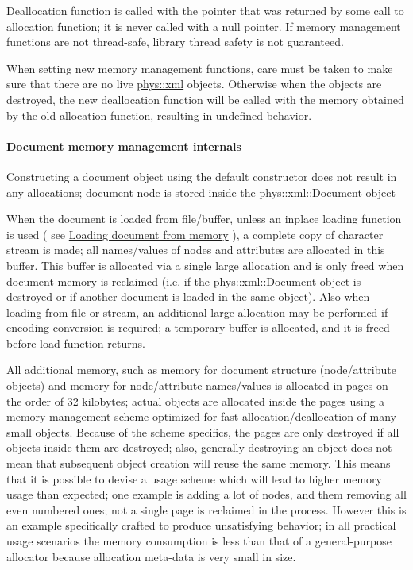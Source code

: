  \par
 Deallocation function is called with the pointer that was returned by some call to allocation function; it is never called with a null pointer. If memory management functions are not thread-\/safe, library thread safety is not guaranteed. \par
 \par
 When setting new memory management functions, care must be taken to make sure that there are no live \hyperlink{namespacephys_1_1xml}{phys::xml} objects. Otherwise when the objects are destroyed, the new deallocation function will be called with the memory obtained by the old allocation function, resulting in undefined behavior. \par
 \par
 \hypertarget{XMLManual_XMLMemoryInternals}{}\paragraph{Document memory management internals}\label{XMLManual_XMLMemoryInternals}
Constructing a document object using the default constructor does not result in any allocations; document node is stored inside the \hyperlink{classphys_1_1xml_1_1Document}{phys::xml::Document} object \par
 \par
 When the document is loaded from file/buffer, unless an inplace loading function is used ( see \hyperlink{XMLManual_XMLLoadingFromMemory}{Loading document from memory} ), a complete copy of character stream is made; all names/values of nodes and attributes are allocated in this buffer. This buffer is allocated via a single large allocation and is only freed when document memory is reclaimed (i.e. if the \hyperlink{classphys_1_1xml_1_1Document}{phys::xml::Document} object is destroyed or if another document is loaded in the same object). Also when loading from file or stream, an additional large allocation may be performed if encoding conversion is required; a temporary buffer is allocated, and it is freed before load function returns. \par
 \par
 All additional memory, such as memory for document structure (node/attribute objects) and memory for node/attribute names/values is allocated in pages on the order of 32 kilobytes; actual objects are allocated inside the pages using a memory management scheme optimized for fast allocation/deallocation of many small objects. Because of the scheme specifics, the pages are only destroyed if all objects inside them are destroyed; also, generally destroying an object does not mean that subsequent object creation will reuse the same memory. This means that it is possible to devise a usage scheme which will lead to higher memory usage than expected; one example is adding a lot of nodes, and them removing all even numbered ones; not a single page is reclaimed in the process. However this is an example specifically crafted to produce unsatisfying behavior; in all practical usage scenarios the memory consumption is less than that of a general-\/purpose allocator because allocation meta-\/data is very small in size. \par
